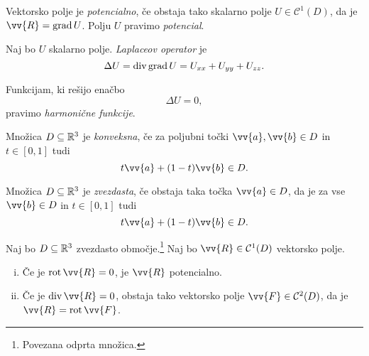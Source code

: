 \begin{definicija}
Vektorsko polje je \emph{potencialno}, če
obstaja tako skalarno polje $U \in \mathcal{C}^1(D)$, da
je $\vv{R} = \grad U$. Polju $U$ pravimo
\emph{potencial}.
\end{definicija}

\begin{definicija}
Naj bo $U$ skalarno polje.
\emph{Laplaceov operator} je
\[
\Delta U =
\operatorname{div} \operatorname{grad} U =
U_{xx} + U_{yy} + U_{zz}.
\]
\end{definicija}

\begin{definicija}
Funkcijam, ki rešijo enačbo
\[
\Delta U = 0,
\]
pravimo \emph{harmonične funkcije}.
\end{definicija}

\begin{definicija}
Množica $D \subseteq \mathbb{R}^3$ je
\emph{konveksna}, če za poljubni točki
$\vv{a}, \vv{b} \in D$ in $t \in [0,1]$ tudi
\[
t \vv{a} + (1-t) \vv{b} \in D.
\]
\end{definicija}

\begin{definicija}
Množica $D \subseteq \mathbb{R}^3$ je
\emph{zvezdasta}, če obstaja taka točka
$\vv{a} \in D$, da je za vse $\vv{b} \in D$ in $t \in [0,1]$ tudi
\[
t \vv{a} + (1-t) \vv{b} \in D.
\]
\end{definicija}


\begin{trditev}
Naj bo $D \subseteq \mathbb{R}^3$ zvezdasto območje.\footnote{Povezana
odprta množica.} Naj bo $\vv{R} \in \mathcal{C}^1(D)$ vektorsko
polje.

\begin{enumerate}[i)]
\item Če je $\rot \vv{R} = 0$, je $\vv{R}$ potencialno.
\item Če je $\dv \vv{R} = 0$, obstaja tako vektorsko polje
$\vv{F} \in \mathcal{C}^2(D)$, da je $\vv{R} = \rot \vv{F}$.
\end{enumerate}
\end{trditev}

